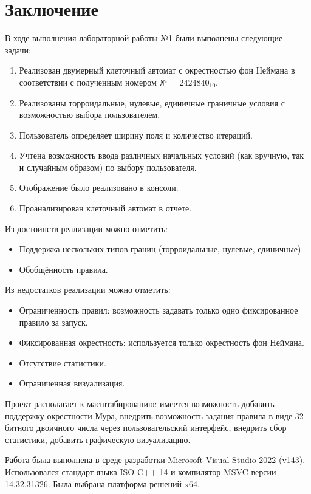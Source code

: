 \documentclass[a4paper, final]{article}
\begin{document}
\cleardoublepage
{}
\newpage
{}
\section*{Заключение}
В ходе выполнения лабораторной работы №1 были выполнены следующие задачи:
\begin{enumerate}
  \item Реализован двумерный клеточный автомат с окрестностью фон Неймана в соответствии с 
  полученным номером № = $2424840_{10}$.
  \item Реализованы торроидальные, нулевые, единичные граничные условия с возможностью выбора пользователем.
  \item Пользователь определяет ширину поля и количество итераций. 
  \item Учтена возможность ввода различных начальных условий (как вручную, так и 
  случайным образом) по выбору пользователя. 
  \item Отображение было реализовано в консоли.
  \item Проанализирован клеточный автомат в отчете.
\end{enumerate}

\noindent Из достоинств реализации можно отметить:
\begin{itemize}
  \item Поддержка нескольких типов границ (торроидальные, нулевые, единичные).
  \item Обобщённость правила.
\end{itemize}

\noindent Из недостатков реализации можно отметить: 
\begin{itemize}
  \item Ограниченность правил: возможность задавать только одно фиксированное правило за запуск.
  \item Фиксированная окрестность: используется только окрестность фон Неймана.
  \item Отсутствие статистики.
  \item Ограниченная визуализация.
\end{itemize}

Проект располагает к масштабированию: имеется возможность добавить поддержку окрестности Мура, внедрить возможность
задания правила в виде 32-битного двоичного числа через пользовательский интерфейс, внедрить сбор статистики, добавить графическую визуализацию.

Работа была выполнена в среде разработки Microsoft Visual Studio 2022 (v143). Использовался стандарт языка ISO C++ 14 и
компилятор MSVC версии 14.32.31326. Была выбрана платформа решений x64.
\end{document}
